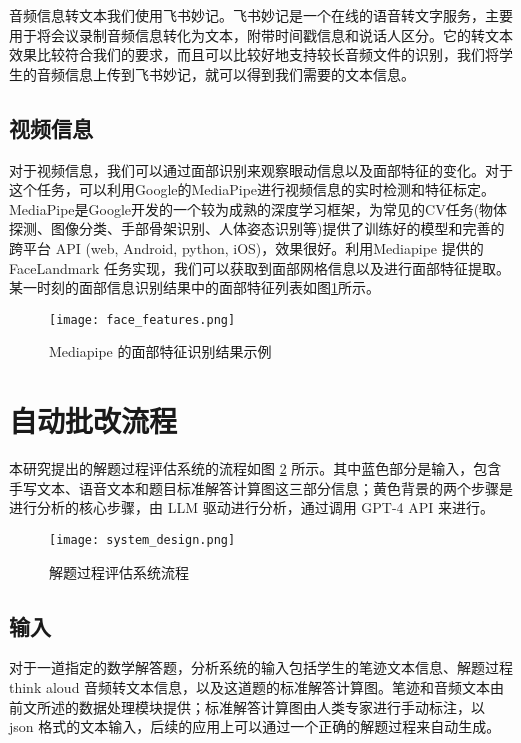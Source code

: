 音频信息转文本我们使用飞书妙记。飞书妙记是一个在线的语音转文字服务，主要用于将会议录制音频信息转化为文本，附带时间戳信息和说话人区分。它的转文本效果比较符合我们的要求，而且可以比较好地支持较长音频文件的识别，我们将学生的音频信息上传到飞书妙记，就可以得到我们需要的文本信息。

\subsection*{视频信息}

对于视频信息，我们可以通过面部识别来观察眼动信息以及面部特征的变化。对于这个任务，可以利用Google的MediaPipe进行视频信息的实时检测和特征标定。MediaPipe是Google开发的一个较为成熟的深度学习框架，为常见的CV任务(物体探测、图像分类、手部骨架识别、人体姿态识别等)提供了训练好的模型和完善的跨平台 API (web, Android, python, iOS)，效果很好。利用Mediapipe 提供的 FaceLandmark 任务实现，我们可以获取到面部网格信息以及进行面部特征提取。某一时刻的面部信息识别结果中的面部特征列表如图\ref{fig:face_features}所示。

\begin{figure}
    \centering
    \texttt{[image: face\_features.png]}
    \caption{Mediapipe 的面部特征识别结果示例}
    \label{fig:face_features}
\end{figure}

\section{自动批改流程}

本研究提出的解题过程评估系统的流程如图 \ref{fig:system_design} 所示。其中蓝色部分是输入，包含手写文本、语音文本和题目标准解答计算图这三部分信息；黄色背景的两个步骤是进行分析的核心步骤，由 LLM 驱动进行分析，通过调用 GPT-4 API 来进行。

\begin{figure}
    \centering
    \texttt{[image: system\_design.png]}
    \caption{解题过程评估系统流程}
    \label{fig:system_design}
\end{figure}

\subsection*{输入}

对于一道指定的数学解答题，分析系统的输入包括学生的笔迹文本信息、解题过程 think aloud 音频转文本信息，以及这道题的标准解答计算图。笔迹和音频文本由前文所述的数据处理模块提供；标准解答计算图由人类专家进行手动标注，以 json 格式的文本输入，后续的应用上可以通过一个正确的解题过程来自动生成。

